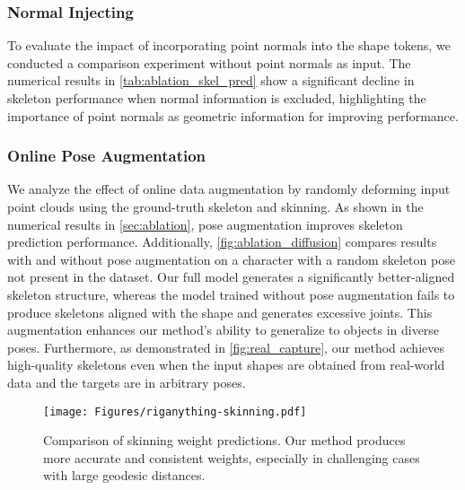 

\subsubsection{Normal Injecting} To evaluate the impact of incorporating point normals into the shape tokens, we conducted a comparison experiment without point normals as input. The numerical results in \cref{tab:ablation_skel_pred} show a significant decline in skeleton performance when normal information is excluded, highlighting the importance of point normals as geometric information for improving performance.


\subsubsection{Online Pose Augmentation} We analyze the effect of online data augmentation by randomly deforming input point clouds using the ground-truth skeleton and skinning. As shown in the numerical results in \cref{sec:ablation}, pose augmentation improves skeleton prediction performance. Additionally, \cref{fig:ablation_diffusion} compares results with and without pose augmentation on a character with a random skeleton pose not present in the dataset. Our full model generates a significantly better-aligned skeleton structure, whereas the model trained without pose augmentation fails to produce skeletons aligned with the shape and generates excessive joints. This augmentation enhances our method's ability to generalize to objects in diverse poses. Furthermore, as demonstrated in \cref{fig:real_capture}, our method achieves high-quality skeletons even when the input shapes are obtained from real-world data and the targets are in arbitrary poses.
\begin{figure}[t]
\texttt{[image: Figures/riganything-skinning.pdf]}
\caption{Comparison of skinning weight predictions. Our method produces more accurate and consistent weights, especially in challenging cases with large geodesic distances.}
\label{fig:skin_pred}
\end{figure}
